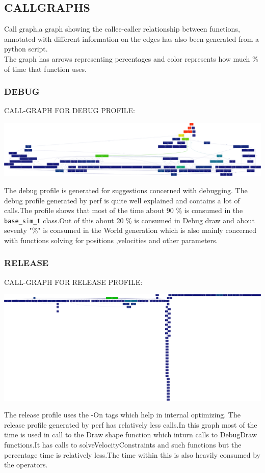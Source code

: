 \documentclass[11pt]{article}
\begin{document}
\subsection{CALLGRAPHS}
Call graph,a graph showing the callee-caller relationship between functions, annotated with different information on the edges has also been generated from a python script.\\
The graph has arrows representing percentages and color represents how much \% of time that function uses.

\subsubsection{DEBUG}
CALL-GRAPH FOR DEBUG PROFILE:
\begin{center}
  \includegraphics[scale=.07]{output_d.png}
\end{center}
The debug profile is generated for suggestions concerned with debugging.
The debug profile generated by perf is quite well explained and contains a lot of calls.The profile shows that most of the time about 90 \% is consumed in the \texttt{base\_sim\_t} class.Out of this about 20 \% is consumed in Debug draw and  about seventy "\%" is consumed in the World generation which is also mainly concerned with functions solving for positions ,velocities and other parameters.   
\subsubsection{RELEASE}
CALL-GRAPH FOR RELEASE PROFILE:
\begin{center}
  \includegraphics[scale=.06]{output_r.png}
\end{center}
The release profile uses the -On tags which help in internal optimizing.
The release profile generated by perf has relatively less calls.In this graph most of the time is used in call to the Draw shape function which inturn calls to DebugDraw functions.It has calls to solveVelocityConstraints and such functions but the percentage time is relatively less.The time within this  is also heavily consumed by the operators.
\end{document}

